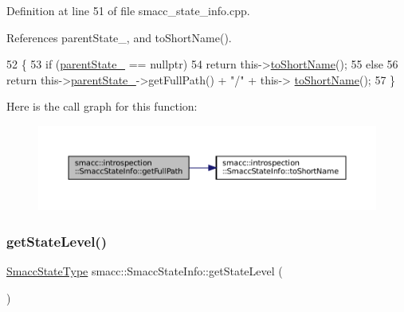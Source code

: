 Definition at line 51 of file smacc\+\_\+state\+\_\+info.\+cpp.



References parent\+State\+\_\+, and to\+Short\+Name().


\begin{DoxyCode}
52 \{
53     \textcolor{keywordflow}{if} (\hyperlink{classsmacc_1_1introspection_1_1SmaccStateInfo_afa49a141d2ccdb3d6f9676ed380ce006}{parentState\_} == \textcolor{keyword}{nullptr})
54         \textcolor{keywordflow}{return} this->\hyperlink{classsmacc_1_1introspection_1_1SmaccStateInfo_a39d7f8a587087b6abd0752058e2d8301}{toShortName}();
55     \textcolor{keywordflow}{else}
56         \textcolor{keywordflow}{return} this->\hyperlink{classsmacc_1_1introspection_1_1SmaccStateInfo_afa49a141d2ccdb3d6f9676ed380ce006}{parentState\_}->getFullPath() + \textcolor{stringliteral}{"/"} + this->
      \hyperlink{classsmacc_1_1introspection_1_1SmaccStateInfo_a39d7f8a587087b6abd0752058e2d8301}{toShortName}();
57 \}
\end{DoxyCode}
Here is the call graph for this function\+:
\nopagebreak
\begin{figure}[H]
\begin{center}
\leavevmode
\includegraphics[width=350pt]{classsmacc_1_1introspection_1_1SmaccStateInfo_a22e625806a74808ee272df5c034d122e_cgraph}
\end{center}
\end{figure}
\mbox{\label{classsmacc_1_1introspection_1_1SmaccStateInfo_a360141a4883f0122a9f5e8b7de456084}} 
\subsubsection{\texorpdfstring{get\+State\+Level()}{getStateLevel()}}
{\footnotesize\ttfamily \hyperlink{namespacesmacc_1_1introspection_a710cf406873961567c11027582c7f720}{Smacc\+State\+Type} smacc\+::\+Smacc\+State\+Info\+::get\+State\+Level (\begin{DoxyParamCaption}{ }\end{DoxyParamCaption})}



